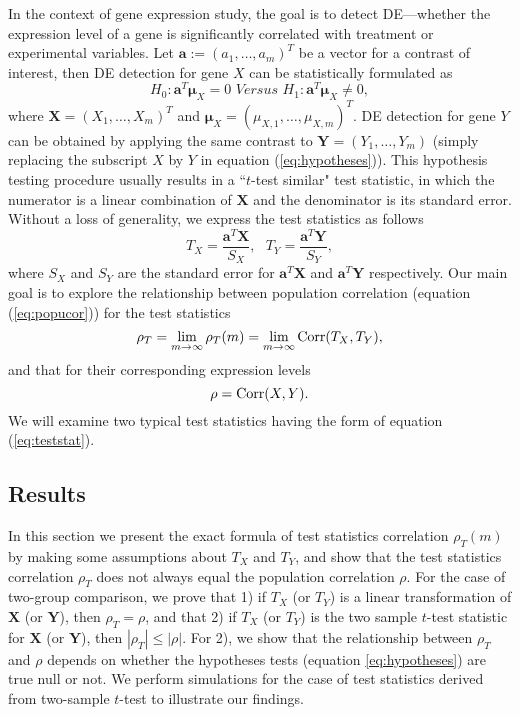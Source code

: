 	In the context of gene expression study, the goal is to detect DE---whether the expression 
	level of a gene is 
	significantly correlated with treatment or experimental variables. Let $\bm a:=(a_1, \ldots, 
	a_m)^T$ be a vector for a contrast of 
	interest, then DE detection for gene $X$ can be statistically formulated as 
	\begin{equation}\label{eq:hypotheses}
	H_{0}:  \bm a^T\bm \mu_X = 0 \textit{     Versus   }  H_{1}: \bm a^T\bm \mu_X \neq 0,
	\end{equation}
	where $\bm X = (X_1, \ldots, X_m)^T$ and $\bm \mu_{X} = (\mu_{X, 1}, \ldots, \mu_{X, m})^T$. 
	DE detection for gene $Y$ can be obtained by applying the same contrast to $\bm Y = (Y_1, 
	\ldots, Y_m)$ (simply replacing the subscript $X$ by $Y$ in equation (\ref{eq:hypotheses})).
	This hypothesis testing procedure usually results in a ``$t$-test similar" test statistic, in 
	which the numerator is a linear combination of 
	$\bm X$ and the denominator is its standard error. Without a loss of generality, we express the 
	test statistics as follows
	\begin{equation}\label{eq:teststat}
	T_X = \dfrac{\bm a^T\bm X}{S_X},  ~~~ T_Y = \dfrac{\bm a^T \bm Y}{S_Y},
	\end{equation}  
	where $S_X$ and $S_Y$ are the standard error for $\bm a^T\bm X$ and $\bm a^T\bm Y$ 
	respectively.	
	Our main goal is to explore the relationship between population correlation (equation 
	(\ref{eq:popucor})) for the test statistics 
	\begin{equation}
	\rho_T= \lim\limits_{m\rightarrow\infty}\rho_T(m) = \lim\limits_{m\rightarrow\infty}\text{Corr}({T_X, 
		T_Y}),
	\end{equation}  
	and that for their corresponding expression levels 
	\begin{equation}
	\rho = \text{Corr}(X, Y). 
	\end{equation}
	We will examine two typical test statistics having the form of equation (\ref{eq:teststat}).%
	
	
	
	\subsection{Results}\label{section:tcorresults}
	
	In this section we present the exact formula of test statistics correlation $\rho_T(m)$ by 
	making some assumptions about $T_X$ and $T_Y$, and show that the test statistics correlation 
	$\rho_T$ does not always equal the population correlation $\rho$. For the case of two-group 
	comparison, we prove that 1) if $T_X$ (or $T_Y$) is a linear transformation of $\bm X$ (or $\bm 
	Y$), 
	then $\rho_T= \rho$, and that 2) if $T_X$ (or $T_Y$) is the two sample $t$-test statistic for 
	$\bm 
	X$ (or $\bm Y$), then $|\rho_T| \leq |\rho|$. For 2), we show that the relationship between 
	$\rho_T$ and $\rho$ depends on whether the hypotheses tests (equation \ref{eq:hypotheses}) are 
	true null or not. We perform simulations for the case of test statistics derived from 
	two-sample $t$-test to illustrate our findings.
	
